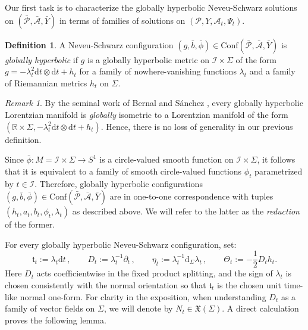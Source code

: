\documentclass[10pt,reqno,a4paper]{amsart}
\theoremstyle{plain}
\theoremstyle{definition}
\newtheorem{definition}[thm]{Definition}
\theoremstyle{remark}
\newtheorem{remark}[thm]{Remark}
\theoremstyle{remark}
\def\dd{\mathrm{d}}
\def\Conf{\mathrm{Conf}}
\def\cA{\mathcal{A}}
\def\cI{\mathcal{I}}
\def\cP{\mathcal{P}}
\renewcommand{\(}{ (}
\renewcommand{\)}{ )}
\begin{document}
Our first task is to characterize the globally hyperbolic Neveu-Schwarz solutions on $(\bar{\cP},\bar{\cA},\bar{Y})$ in terms of families of solutions on $(\cP, Y , \cA_t  , \Psi_t)$.

\begin{definition}
A Neveu-Schwarz configuration $(g ,\bar{b},\bar{\phi})\in \Conf(\bar{\cP},\bar{\cA},\bar{Y})$ is \emph{globally hyperbolic} if $g$ is a globally hyperbolic metric on $\cI\times \Sigma$ of the form $g = - \lambda_t^2 \dd t\otimes \dd t + h_t$ for a family of nowhere-vanishing functions $\lambda_t$ and a family of Riemannian metrics $h_t$ on $\Sigma$.   
\end{definition}

\begin{remark}
By the seminal work of Bernal and S\'anchez \cite{Bernal:2003jb,Bernal:2004gm}, every globally hyperbolic Lorentzian manifold is \emph{globally} isometric to a Lorentzian manifold of the form $(\mathbb{R}\times \Sigma, - \lambda_t^2 \dd t\otimes \dd t + h_t)$. Hence, there is no loss of generality in our previous definition. 
\end{remark}

\noindent
Since $\bar{\phi} \colon M = \cI \times \Sigma \to S^1$ is a circle-valued smooth function on $\cI\times \Sigma$, it follows that it is equivalent to a family of smooth circle-valued functions $\phi_t$ parametrized by $t\in \cI$. Therefore, globally hyperbolic configurations $(g , \bar{b}, \bar{\phi}) \in \Conf(\bar{\cP},\bar{\cA},\bar{Y})$ are in one-to-one correspondence with tuples $( h_t , a_t , b_t , \phi_t , \lambda_t)$ as described above. We will refer to the latter as the \emph{reduction} of the former. 

\noindent
For every globally hyperbolic Neveu-Schwarz configuration, set:
\begin{equation*}
\mathfrak{t}_t:=\lambda_t\dd t\, ,  \qquad D_t:=\lambda_t^{-1}\partial_t\, , \qquad \eta_t:=\lambda_t^{-1}\dd_{\Sigma}\lambda_t\, , \qquad \Theta_t:=-\frac{1}{2}D_t h_t.
\end{equation*}
Here $D_t$ acts coefficientwise in the fixed product splitting, and the sign of $\lambda_t$ is chosen consistently with the normal orientation so that $\mathfrak{t}_t$ is the chosen unit time-like normal one-form. For clarity in the exposition, when understanding $D_t$ as a family of vector fields on $\Sigma$, we will denote by $N_t \in \mathfrak{X}(\Sigma)$. A direct calculation proves the following lemma.  
\end{document}
